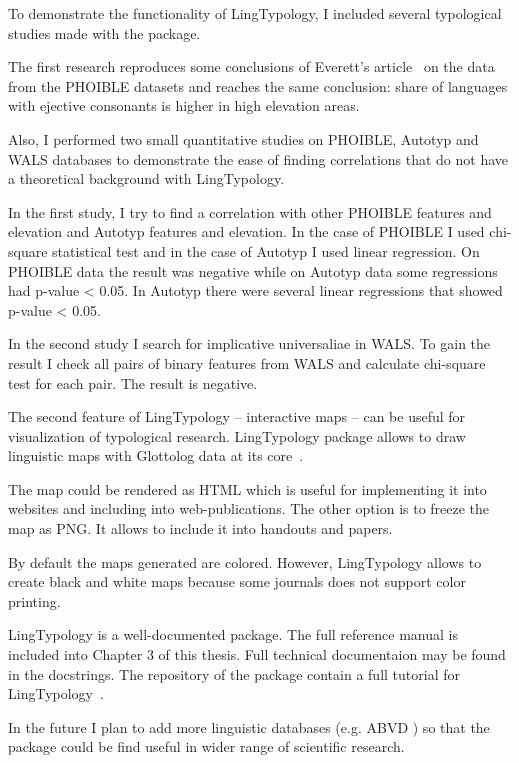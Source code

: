 \documentclass[a4paper,12pt]{article}
\begin{document}
To demonstrate the functionality of LingTypology, I included several typological studies made with the package.

The first research reproduces some conclusions of Everett's article~\parencite{ejectives} on the data from the PHOIBLE datasets and reaches the same conclusion: share of languages with ejective consonants is higher in high elevation areas.

Also, I performed two small quantitative studies on PHOIBLE, Autotyp and WALS databases to demonstrate the ease of finding correlations that do not have a theoretical background with LingTypology.

In the first study, I try to find a correlation with other PHOIBLE features and elevation and Autotyp features and elevation. In the case of PHOIBLE I used chi-square statistical test and in the case of Autotyp I used linear regression. On PHOIBLE data the result was negative while on Autotyp data some regressions had p-value < 0.05. In Autotyp there were several linear regressions that showed p-value < 0.05.

In the second study I search for implicative universaliae in WALS. To gain the result I check all pairs of binary features from WALS and calculate chi-square test for each pair. The result is negative.

The second feature of LingTypology -- interactive maps -- can be useful for visualization of typological research. LingTypology package allows to draw linguistic maps with Glottolog data at its core~\parencite{HaraldHammarstrom2019}.

The map could be rendered as HTML which is useful for implementing it into websites and including into web-publications. The other option is to freeze the map as PNG. It allows to include it into handouts and papers.

By default the maps generated are colored. However, LingTypology allows to create black and white maps because some journals does not support color printing.

LingTypology is a well-documented package. The full reference manual is included into Chapter 3 of this thesis. Full technical documentaion may be found in the docstrings. The repository of the package contain a full tutorial for LingTypology~\parencite{Govnov2019}.

In the future I plan to add more linguistic databases (e.g. ABVD \parencite{abvd}) so that the package could be find useful in wider range of scientific research.
\end{document}
